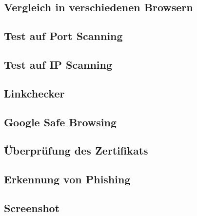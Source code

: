 
\subsection{Vergleich in verschiedenen Browsern}


\subsection{Test auf Port Scanning}


\subsection{Test auf IP Scanning}


\subsection{Linkchecker}


\subsection{Google Safe Browsing}


\subsection{Überprüfung des Zertifikats}


\subsection{Erkennung von Phishing}


\subsection{Screenshot}


